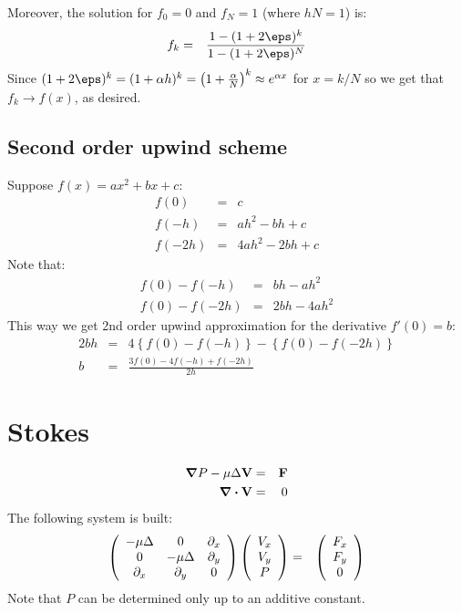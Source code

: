\documentclass[11pt]{article}
\begin{document}
Moreover, the solution for $f_0 = 0$ and $f_N = 1$ (where $h N = 1$) is:
\begin{eqnarray}
f_k &=& \frac{1 - (1+2\eps)^k}{1 - (1+2\eps)^N}
\end{eqnarray}
Since $(1+2\eps)^k = (1+\alpha h)^k = \left(1 + \frac{\alpha}{N}\right)^k \approx e^{\alpha x}$ for $x = k/N$
so we get that $f_k \rightarrow f(x)$, as desired.
\subsection{Second order upwind scheme}
Suppose $f(x) = ax^2 + bx + c$:
\begin{eqnarray}
  f(0) &=& c \\
  f(-h) &=& ah^2 - bh + c \\
  f(-2h) &=& 4ah^2 - 2bh + c
\end{eqnarray}
Note that:
\begin{eqnarray}
  f(0) - f(-h) &=& bh - ah^2 \\
  f(0) - f(-2h) &=& 2bh - 4ah^2
\end{eqnarray}
This way we get 2nd order upwind approximation for the derivative $f'(0) = b$:
\begin{eqnarray}
  2bh &=& 4\left\{f(0) - f(-h)\right\} - \left\{f(0) - f(-2h)\right\} \\
  b &=& \frac{3f(0) - 4f(-h) + f(-2h)}{2h}
\end{eqnarray}

\section{Stokes}
\begin{eqnarray}
 \bnabla P - \mu \Delta \mathbf{V} &=& \mathbf{F} \\
 \bnabla \bcdot \mathbf{V} &=& 0
\end{eqnarray}
The following system is built:
\begin{eqnarray}
 \mat{ccc}{-\mu\Delta & 0 & \partial_x \\ 0 & -\mu\Delta & \partial_y \\ \partial_x & \partial_y & 0}
 \mat{c}{V_x \\ V_y \\ P} &=& \mat{c}{F_x \\ F_y \\ 0}
\end{eqnarray}
Note that $P$ can be determined only up to an additive constant.
\end{document}
